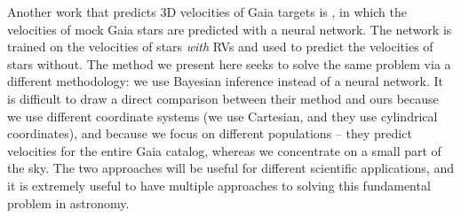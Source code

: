 Another work that predicts 3D velocities of Gaia targets is
\citet{dropulic2021}, in which the velocities of mock Gaia stars are predicted
with a neural network.
The network is trained on the velocities of stars {\it with} RVs and used to
predict the velocities of stars without.
The method we present here seeks to solve the same problem via a different
methodology: we use Bayesian inference instead of a neural network.
It is difficult to draw a direct comparison between their method and ours
because we use different coordinate systems (we use Cartesian, and they use
cylindrical coordinates), and because we focus on different populations --
they predict velocities for the entire Gaia catalog, whereas we concentrate on
a small part of the sky.
The two approaches will be useful for different scientific applications, and
it is extremely useful to have multiple approaches to solving this fundamental
problem in astronomy.


